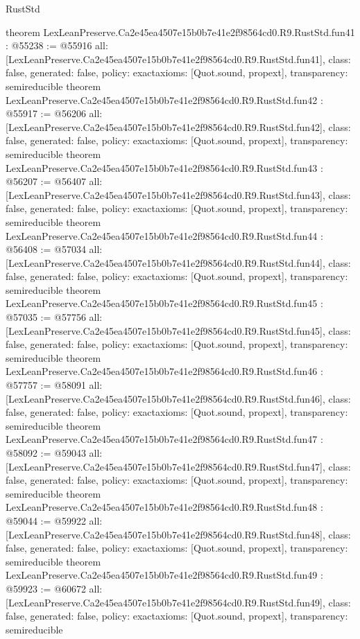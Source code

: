 \begin{lexlean}{RustStd}
\begin{coremodule}
{}
theorem LexLeanPreserve.Ca2e45ea4507e15b0b7e41e2f98564cd0.R9.RustStd.fun41 : @55238 := @55916 {
  all: [LexLeanPreserve.Ca2e45ea4507e15b0b7e41e2f98564cd0.R9.RustStd.fun41],
  class: false,
  generated: false,
  policy: exact{axioms: [Quot.sound, propext]},
  transparency: semireducible
}
theorem LexLeanPreserve.Ca2e45ea4507e15b0b7e41e2f98564cd0.R9.RustStd.fun42 : @55917 := @56206 {
  all: [LexLeanPreserve.Ca2e45ea4507e15b0b7e41e2f98564cd0.R9.RustStd.fun42],
  class: false,
  generated: false,
  policy: exact{axioms: [Quot.sound, propext]},
  transparency: semireducible
}
theorem LexLeanPreserve.Ca2e45ea4507e15b0b7e41e2f98564cd0.R9.RustStd.fun43 : @56207 := @56407 {
  all: [LexLeanPreserve.Ca2e45ea4507e15b0b7e41e2f98564cd0.R9.RustStd.fun43],
  class: false,
  generated: false,
  policy: exact{axioms: [Quot.sound, propext]},
  transparency: semireducible
}
theorem LexLeanPreserve.Ca2e45ea4507e15b0b7e41e2f98564cd0.R9.RustStd.fun44 : @56408 := @57034 {
  all: [LexLeanPreserve.Ca2e45ea4507e15b0b7e41e2f98564cd0.R9.RustStd.fun44],
  class: false,
  generated: false,
  policy: exact{axioms: [Quot.sound, propext]},
  transparency: semireducible
}
theorem LexLeanPreserve.Ca2e45ea4507e15b0b7e41e2f98564cd0.R9.RustStd.fun45 : @57035 := @57756 {
  all: [LexLeanPreserve.Ca2e45ea4507e15b0b7e41e2f98564cd0.R9.RustStd.fun45],
  class: false,
  generated: false,
  policy: exact{axioms: [Quot.sound, propext]},
  transparency: semireducible
}
theorem LexLeanPreserve.Ca2e45ea4507e15b0b7e41e2f98564cd0.R9.RustStd.fun46 : @57757 := @58091 {
  all: [LexLeanPreserve.Ca2e45ea4507e15b0b7e41e2f98564cd0.R9.RustStd.fun46],
  class: false,
  generated: false,
  policy: exact{axioms: [Quot.sound, propext]},
  transparency: semireducible
}
theorem LexLeanPreserve.Ca2e45ea4507e15b0b7e41e2f98564cd0.R9.RustStd.fun47 : @58092 := @59043 {
  all: [LexLeanPreserve.Ca2e45ea4507e15b0b7e41e2f98564cd0.R9.RustStd.fun47],
  class: false,
  generated: false,
  policy: exact{axioms: [Quot.sound, propext]},
  transparency: semireducible
}
theorem LexLeanPreserve.Ca2e45ea4507e15b0b7e41e2f98564cd0.R9.RustStd.fun48 : @59044 := @59922 {
  all: [LexLeanPreserve.Ca2e45ea4507e15b0b7e41e2f98564cd0.R9.RustStd.fun48],
  class: false,
  generated: false,
  policy: exact{axioms: [Quot.sound, propext]},
  transparency: semireducible
}
theorem LexLeanPreserve.Ca2e45ea4507e15b0b7e41e2f98564cd0.R9.RustStd.fun49 : @59923 := @60672 {
  all: [LexLeanPreserve.Ca2e45ea4507e15b0b7e41e2f98564cd0.R9.RustStd.fun49],
  class: false,
  generated: false,
  policy: exact{axioms: [Quot.sound, propext]},
  transparency: semireducible
}
\end{coremodule}
\end{lexlean}
